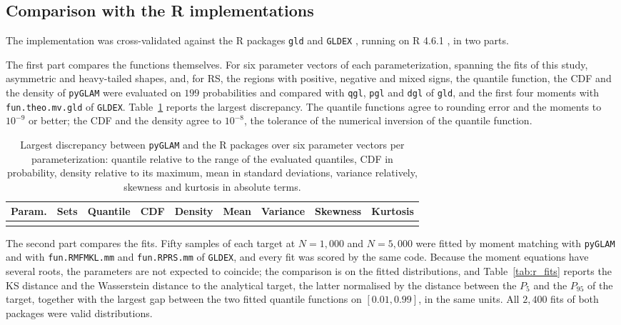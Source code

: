 \subsection{Comparison with the R implementations}\label{subsec:r_comparison}

The implementation was cross-validated against the R packages \texttt{gld}
\parencite{KingGld} and \texttt{GLDEX} \parencite{Su2007JSS, SuGLDEX}, running on
R 4.6.1 \parencite{RCore}, in two parts.

The first part compares the functions themselves. For six parameter vectors of
each parameterization, spanning the fits of this study, asymmetric and
heavy-tailed shapes, and, for RS, the regions with positive, negative and mixed
signs, the quantile function, the CDF and the density of \texttt{pyGLAM} were
evaluated on $199$ probabilities and compared with \texttt{qgl}, \texttt{pgl} and
\texttt{dgl} of \texttt{gld}, and the first four moments with
\texttt{fun.theo.mv.gld} of \texttt{GLDEX}. Table~\ref{tab:r_functions} reports
the largest discrepancy. The quantile functions agree to rounding error and the
moments to $10^{-9}$ or better; the CDF and the density agree to $10^{-8}$, the
tolerance of the numerical inversion of the quantile function.

\begin{table}[htbp]
\centering
\caption{Largest discrepancy between \texttt{pyGLAM} and the R packages over six
parameter vectors per parameterization: quantile relative to the range of the
evaluated quantiles, CDF in probability, density relative to its maximum, mean in
standard deviations, variance relatively, skewness and kurtosis in absolute
terms.}
\label{tab:r_functions}
\footnotesize
\setlength{\tabcolsep}{3.5pt}
\begin{tabular}{lrccccccc}
\toprule
\textbf{Param.} & \textbf{Sets} & \textbf{Quantile} & \textbf{CDF} & \textbf{Density} &
\textbf{Mean} & \textbf{Variance} & \textbf{Skewness} & \textbf{Kurtosis} \\
\midrule
\unskip \\
\bottomrule
\end{tabular}
\end{table}

The second part compares the fits. Fifty samples of each target at
$N = 1{,}000$ and $N = 5{,}000$ were fitted by moment matching with
\texttt{pyGLAM} and with \texttt{fun.RMFMKL.mm} and \texttt{fun.RPRS.mm} of
\texttt{GLDEX}, and every fit was scored by the same code. Because the moment
equations have several roots, the parameters are not expected to coincide; the
comparison is on the fitted distributions, and Table~\ref{tab:r_fits} reports
the KS distance and the Wasserstein distance to the analytical target, the
latter normalised by the distance between the $P_5$ and the $P_{95}$ of the
target, together with the largest gap between the two fitted quantile functions
on $[0.01, 0.99]$, in the same units. All $2{,}400$ fits of both packages were
valid distributions.

